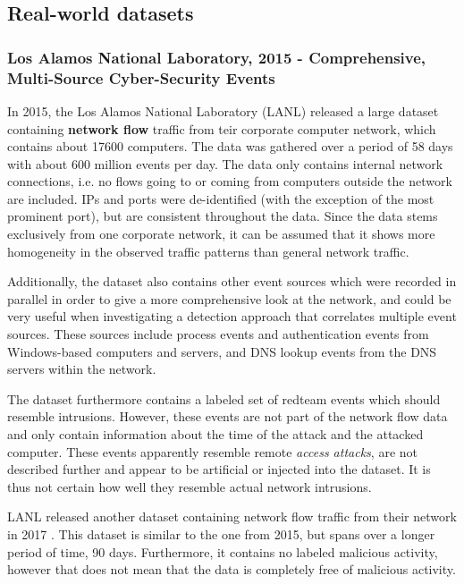 \subsection{Real-world datasets}

\subsubsection*{Los Alamos National Laboratory, 2015 - Comprehensive, Multi-Source Cyber-Security Events \cite{akent-2015-enterprise-data}\cite{kent-2015-cyberdata1}}

In 2015, the Los Alamos National Laboratory (LANL) released a large dataset containing \textbf{network flow} traffic from teir corporate computer network, which contains about 17600 computers. The data was gathered over a period of 58 days with about 600 million events per day. The data only contains internal network connections, i.e. no flows going to or coming from computers outside the network are included. IPs and ports were de-identified (with the exception of the most prominent port), but are consistent throughout the data. Since the data stems exclusively from one corporate network, it can be assumed that it shows more homogeneity in the observed traffic patterns than  general network traffic.

Additionally, the dataset also contains other event sources which were recorded in parallel in order to give a more comprehensive look at the network, and could be very useful when investigating a detection approach that correlates multiple event sources. These sources include process events and authentication events from Windows-based computers and servers, and DNS lookup events from the DNS servers within the network. 

The dataset furthermore contains a labeled set of redteam events which should resemble intrusions. However, these events are not part of the network flow data and only contain information about the time of the attack and the attacked computer. These events apparently resemble remote \textit{access attacks}, are not described further and appear to be artificial or injected into the dataset. It is thus not certain how well they resemble actual network intrusions.


LANL released another dataset containing network flow traffic from their network in 2017 \cite{turcotte17}. This dataset is similar to the one from 2015, but spans over a longer period of time, 90 days. Furthermore, it contains no labeled malicious activity,  however that does not mean that the data is completely free of malicious activity.

